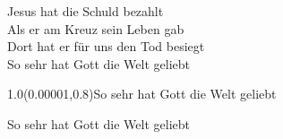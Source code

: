 \documentclass[aspectratio=169]{beamer}
\begin{document}
\begin{frame}
\centering
\color{white}
\huge{Jesus hat die Schuld bezahlt} \\
\huge{Als er am Kreuz sein Leben gab} \\
\huge{Dort hat er für uns den Tod besiegt} \\
\huge{So sehr hat Gott die Welt geliebt} \\

\begin{textblock}{1.0}(0.00001,0.8)\color{gray}\normalsize{So sehr hat Gott die Welt geliebt}\end{textblock}
\end{frame}

\begin{frame}
\centering
\color{white}
\huge{So sehr hat Gott die Welt geliebt} \\
\end{frame}
\end{document}
